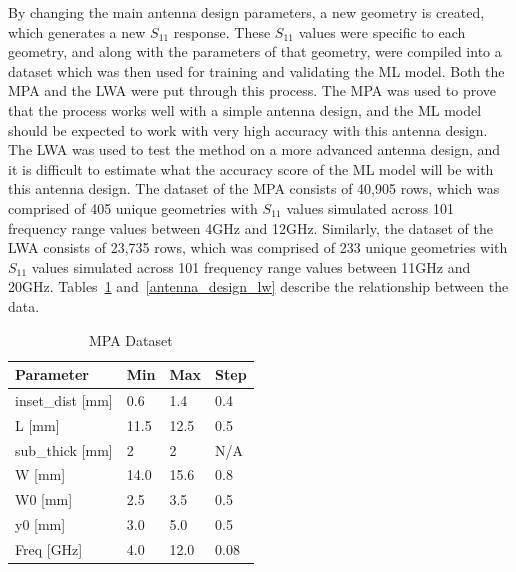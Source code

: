 \documentclass[conference]{IEEEtran}
\begin{document}
By changing the main antenna design parameters, a new geometry is created, which generates a new $S_{11}$ response. These $S_{11}$ values were specific to each geometry, and along with the parameters of that geometry, were compiled into a dataset which was then used for training and validating the ML model. Both the MPA and the LWA were put through this process. The MPA was used to prove that the process works well with a simple antenna design, and the ML model should be expected to work with very high accuracy with this antenna design. The LWA was used to test the method on a more advanced antenna design, and it is difficult to estimate what the accuracy score of the ML model will be with this antenna design. The dataset of the MPA consists of 40,905 rows, which was comprised of 405 unique geometries with $S_{11}$ values simulated across 101 frequency range values between 4GHz and 12GHz. Similarly, the dataset of the LWA consists of 23,735 rows, which was comprised of 233 unique geometries with $S_{11}$ values simulated across 101 frequency range values between 11GHz and 20GHz. Tables~\ref{antenna_dataset_p} and~\ref{antenna_design_lw} describe the relationship between the data.

\begin{table}[h]
\caption{MPA Dataset}
\begin{center}
\begin{tabular}{ |l|l|l|l| }
    \hline
    Parameter & Min & Max & Step \\ 
    \hline
    inset\_dist [mm] & 0.6 & 1.4 & 0.4 \\
    \hline
    L [mm] & 11.5 & 12.5 & 0.5 \\
    \hline
    sub\_thick [mm] & 2 & 2 & N/A \\
    \hline
    W [mm] & 14.0 & 15.6 & 0.8 \\
    \hline
    W0 [mm] & 2.5 & 3.5 & 0.5 \\
    \hline
    y0 [mm] & 3.0 & 5.0 & 0.5 \\
    \hline
    Freq [GHz] & 4.0 & 12.0 & 0.08 \\
    \hline
\end{tabular}
\end{center}
\label{antenna_dataset_p}
\end{table}
\end{document}
